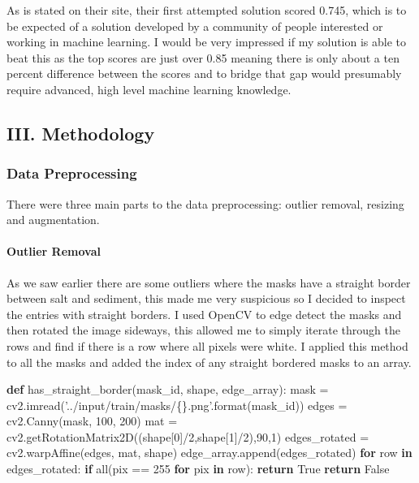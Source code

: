 \documentclass[11pt]{article}
\newenvironment{Shaded}{}{}
\newcommand{\KeywordTok}[1]{\textcolor[rgb]{0.00,0.44,0.13}{\textbf{{#1}}}}
\newcommand{\DecValTok}[1]{\textcolor[rgb]{0.25,0.63,0.44}{{#1}}}
\newcommand{\StringTok}[1]{\textcolor[rgb]{0.25,0.44,0.63}{{#1}}}
\newcommand{\NormalTok}[1]{{#1}}
\newcommand{\SpecialCharTok}[1]{\textcolor[rgb]{0.25,0.44,0.63}{{#1}}}
\newcommand{\VariableTok}[1]{\textcolor[rgb]{0.10,0.09,0.49}{{#1}}}
\newcommand{\ControlFlowTok}[1]{\textcolor[rgb]{0.00,0.44,0.13}{\textbf{{#1}}}}
\newcommand{\OperatorTok}[1]{\textcolor[rgb]{0.40,0.40,0.40}{{#1}}}
\newcommand{\BuiltInTok}[1]{{#1}}
\begin{document}
As is stated on their site, their first attempted solution scored 0.745,
which is to be expected of a solution developed by a community of people
interested or working in machine learning. I would be very impressed if
my solution is able to beat this as the top scores are just over 0.85
meaning there is only about a ten percent difference between the scores
and to bridge that gap would presumably require advanced, high level
machine learning knowledge.

\subsection{III. Methodology}\label{iii.-methodology}

\subsubsection{Data Preprocessing}\label{data-preprocessing}

There were three main parts to the data preprocessing: outlier removal,
resizing and augmentation.

\paragraph{Outlier Removal}\label{outlier-removal}

As we saw earlier there are some outliers where the masks have a
straight border between salt and sediment, this made me very suspicious
so I decided to inspect the entries with straight borders. I used OpenCV
to edge detect the masks and then rotated the image sideways, this
allowed me to simply iterate through the rows and find if there is a row
where all pixels were white. I applied this method to all the masks and
added the index of any straight bordered masks to an array.

\begin{Shaded}
\begin{Highlighting}[]
\KeywordTok{def}\NormalTok{ has_straight_border(mask_id, shape, edge_array):}
\NormalTok{    mask }\OperatorTok{=}\NormalTok{ cv2.imread(}\StringTok{'../input/train/masks/}\SpecialCharTok{\{\}}\StringTok{.png'}\NormalTok{.}\BuiltInTok{format}\NormalTok{(mask_id))}
\NormalTok{    edges }\OperatorTok{=}\NormalTok{ cv2.Canny(mask, }\DecValTok{100}\NormalTok{, }\DecValTok{200}\NormalTok{)}
\NormalTok{    mat }\OperatorTok{=}\NormalTok{ cv2.getRotationMatrix2D((shape[}\DecValTok{0}\NormalTok{]}\OperatorTok{/}\DecValTok{2}\NormalTok{,shape[}\DecValTok{1}\NormalTok{]}\OperatorTok{/}\DecValTok{2}\NormalTok{),}\DecValTok{90}\NormalTok{,}\DecValTok{1}\NormalTok{)}
\NormalTok{    edges_rotated }\OperatorTok{=}\NormalTok{ cv2.warpAffine(edges, mat, shape)}
\NormalTok{    edge_array.append(edges_rotated)}
    \ControlFlowTok{for}\NormalTok{ row }\KeywordTok{in}\NormalTok{ edges_rotated:}
        \ControlFlowTok{if} \BuiltInTok{all}\NormalTok{(pix }\OperatorTok{==} \DecValTok{255} \ControlFlowTok{for}\NormalTok{ pix }\KeywordTok{in}\NormalTok{ row):}
            \ControlFlowTok{return} \VariableTok{True}
    \ControlFlowTok{return} \VariableTok{False}
\end{Highlighting}
\end{Shaded}
\end{document}
